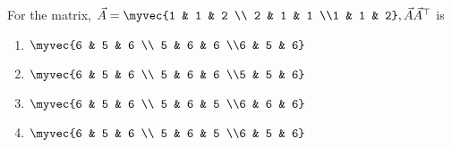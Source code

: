 \item For the matrix, 
$
\vec{A}= 
\myvec{1 & 1 & 2 \\ 2 & 1 & 1 \\1 & 1 & 2}, 
\vec{A}\vec{A}^{\top} $ is
\hfill{}
\begin{multicols}{4}
\begin{enumerate}
    \item $\myvec{6 & 5 & 6 \\ 5 & 6 & 6 \\6 & 5 & 6}$
    \item $\myvec{6 & 5 & 6 \\ 5 & 6 & 6 \\5 & 5 & 6}$
    \item $\myvec{6 & 5 & 6 \\ 5 & 6 & 5 \\6 & 6 & 6}$
    \item $\myvec{6 & 5 & 6 \\ 5 & 6 & 5 \\6 & 5 & 6}$
\end{enumerate}
\end{multicols}

